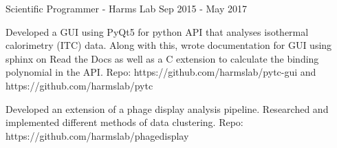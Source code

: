 \begin{cventries}
  \cventry
    {Scientific Programmer - Harms Lab} %
    {} %
    {} %
    {Sep 2015 - May 2017} %
    {
      \begin{cvitems} %
        \item {Developed a GUI using PyQt5 for python API that analyses isothermal calorimetry (ITC) data. Along with this, wrote documentation for GUI using sphinx on Read the Docs as well as a C extension to calculate the binding polynomial in the API. \newline Repo: https://github.com/harmslab/pytc-gui and https://github.com/harmslab/pytc}
        \item {Developed an extension of a phage display analysis pipeline. Researched and implemented different methods of data clustering. \newline Repo: https://github.com/harmslab/phagedisplay}
      \end{cvitems}
    }

\end{cventries}
